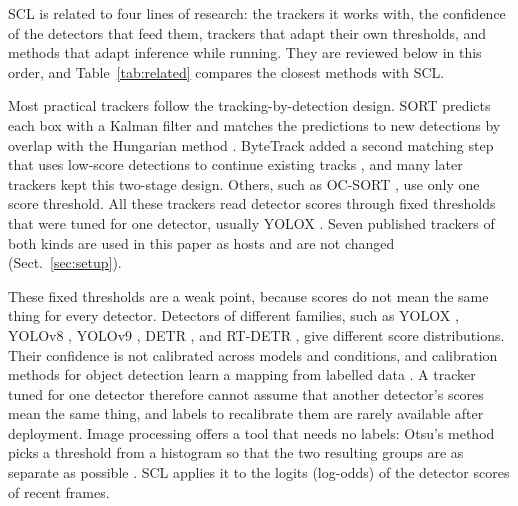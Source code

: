 \documentclass[pdflatex,sn-mathphys-num,iicol]{sn-jnl}
\makeatletter
\def\sectionfont{\reset@font\fontfamily{\rmdefault}\fontsize{11bp}{13bp}\bfseries\selectfont\raggedright\boldmath}
\renewcommand\section{\@startsection{section}{1}{\z@}{-8pt \@plus -2pt \@minus -2pt}{4pt}{\sectionfont}}
\newcommand{\scl}{SCL}
\makeatother
\begin{document}
\section{Related Work}\label{sec:related}

\scl{} is related to four lines of research: the trackers it works with, the
confidence of the detectors that feed them, trackers that adapt their own
thresholds, and methods that adapt inference while running. They are
reviewed below in this order, and Table~\ref{tab:related} compares the
closest methods with \scl{}.

Most practical trackers follow the tracking-by-detection design. SORT
predicts each box with a Kalman filter and matches the predictions to new
detections by overlap with the Hungarian method \cite{bewley2016sort}.
ByteTrack added a second matching step that uses low-score detections to
continue existing tracks \cite{zhang2022bytetrack}, and many later trackers
kept this two-stage design. Others, such as OC-SORT \cite{cao2023ocsort}, use
only one score threshold. All these trackers read detector scores through
fixed thresholds that were tuned for one detector, usually YOLOX
\cite{ge2021yolox}. Seven published trackers of both kinds are used in this
paper as hosts and are not changed (Sect.~\ref{sec:setup}).

These fixed thresholds are a weak point, because scores do not mean the same
thing for every detector. Detectors of different families, such as YOLOX
\cite{ge2021yolox}, YOLOv8 \cite{jocher2023yolov8}, YOLOv9
\cite{wang2024yolov9}, DETR \cite{carion2020detr}, and RT-DETR
\cite{zhao2024rtdetr}, give different score distributions. Their confidence
is not calibrated across models and conditions, and calibration methods for
object detection learn a mapping from labelled data
\cite{kuppers2020detcalib}. A tracker tuned for one detector therefore cannot
assume that another detector's scores mean the same thing, and labels to
recalibrate them are rarely available after deployment. Image processing
offers a tool that needs no labels: Otsu's method picks a threshold from a
histogram so that the two resulting groups are as separate as possible
\cite{otsu1979}. \scl{} applies it to the logits (log-odds) of the detector
scores of recent frames.
\end{document}

